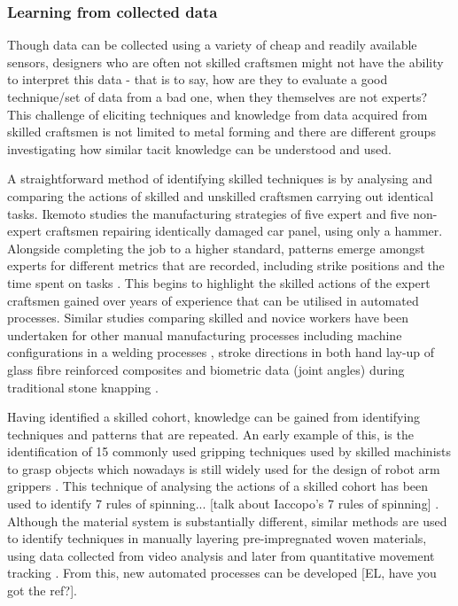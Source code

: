 \subsubsection{Learning from collected data}
Though data can be collected using a variety of cheap and readily available sensors, designers who are often not skilled craftsmen might not have the ability to interpret this data - that is to say, how are they to evaluate a good technique/set of data from a bad one, when they themselves are not experts? 
This challenge of eliciting techniques and knowledge from data acquired from skilled craftsmen is not limited to metal forming and there are different groups investigating how similar tacit knowledge can be understood and used.

A straightforward method of identifying skilled techniques is by analysing and comparing the actions of skilled and unskilled craftsmen carrying out identical tasks. Ikemoto studies the manufacturing strategies of five expert and five non-expert craftsmen repairing identically damaged car panel, using only a hammer.  Alongside completing the job to a higher standard, patterns emerge amongst experts for different metrics that are recorded, including strike positions \citep{Ikemoto2018ProcessRepair} and the time spent on tasks \citep{Ikemoto2016ARepair}. This begins to highlight the skilled actions of the expert craftsmen gained over years of experience that can be utilised in automated processes. Similar studies comparing skilled and novice workers have been undertaken for other manual manufacturing processes including machine configurations in a welding processes \citep{Manorathna2017HumanAutomation}, stroke directions in both hand lay-up of glass fibre reinforced composites \citep{Xie2016EffectMethod, Kikuchi2016ResearchLay-up} and biometric data (joint angles) during traditional stone knapping \citep{Rein2014MovementTraditions}. 

Having identified a skilled cohort, knowledge can be gained from identifying techniques and patterns that are repeated. An early example of this, is the identification of 15 commonly used gripping techniques used by skilled machinists to grasp objects \citep{Cutkosky1986ModellingHands} which nowadays is still widely used for the design of robot arm grippers \citep{Feix2016TheTypes}. This technique of analysing the actions of a skilled cohort has been used to identify 7 rules of spinning... [talk about Iaccopo's 7 rules of spinning] \citep{Russo2020ResearchSpinning}.
Although the material system is substantially different, similar methods are used to identify techniques in manually layering pre-impregnated woven materials, using data collected from video analysis \citep{Elkington2015HandProcess, Elkington2015StudyingLayup} and later from quantitative movement tracking \citep{Prabhu2017DigitisationTechnology}. From this, new automated processes can be developed [EL, have you got the ref?]. 

